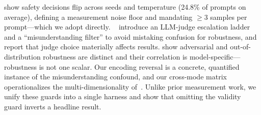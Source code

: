  \citet{instability2025} show safety decisions flip across seeds and temperature (24.8\% of prompts on average), defining a measurement noise floor and mandating $\geq 3$ samples per prompt---which we adopt directly. \clearbias~\citep{clearbias2025} introduce an LLM-judge escalation ladder and a ``misunderstanding filter'' to avoid mistaking confusion for robustness, and report that judge choice materially affects results. \citet{ad-vs-ood2024} show adversarial and out-of-distribution robustness are distinct and their correlation is model-specific---robustness is not one scalar. Our encoding reversal is a concrete, quantified instance of the \clearbias misunderstanding confound, and our cross-mode matrix operationalizes the multi-dimensionality of~\citet{ad-vs-ood2024}. Unlike prior measurement work, we unify these guards into a single harness and show that omitting the validity guard inverts a headline result.
